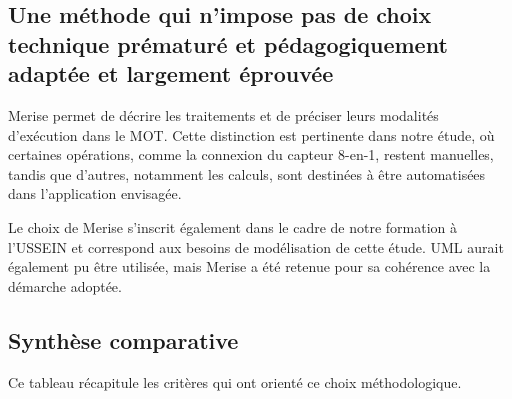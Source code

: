 \subsection{Une méthode qui n’impose pas de choix technique prématuré et pédagogiquement adaptée et largement éprouvée}
Merise permet de décrire les traitements et de préciser leurs modalités d’exécution dans le MOT. Cette distinction est pertinente dans notre étude, où certaines opérations, comme la connexion du capteur 8-en-1, restent manuelles, tandis que d’autres, notamment les calculs, sont destinées à être automatisées dans l’application envisagée.

Le choix de Merise s’inscrit également dans le cadre de notre formation à l’USSEIN et correspond aux besoins de modélisation de cette étude. UML aurait également pu être utilisée, mais Merise a été retenue pour sa cohérence avec la démarche adoptée.

\subsection{Synthèse comparative}
Ce tableau récapitule les critères qui ont orienté ce choix méthodologique.

